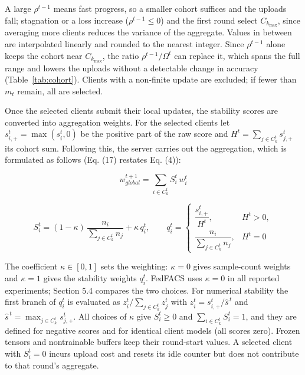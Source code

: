 \documentclass[pdflatex,sn-mathphys-num,oneside]{sn-jnl}%
\theoremstyle{thmstyleone}%
\theoremstyle{thmstyletwo}%
\theoremstyle{thmstylethree}%
\begin{document}
A large $\rho^{t-1}$ means fast progress, so a smaller cohort suffices and the uploads fall; stagnation or a loss increase ($\rho^{t-1}\le 0$) and the first round select $C_{k_{\max}}$, since averaging more clients reduces the variance of the aggregate. Values in between are interpolated linearly and rounded to the nearest integer. Since $\rho^{t-1}$ alone keeps the cohort near $C_{k_{\max}}$, the ratio $\rho^{t-1}/\Omega^{t}$ can replace it, which spans the full range and lowers the uploads without a detectable change in accuracy (Table~\ref{tab:cohort}). Clients with a non-finite update are excluded; if fewer than $m_t$ remain, all are selected.

Once the selected clients submit their local updates, the stability scores are converted into aggregation weights. For the selected clients let $s_{i,+}^t=\max(s_i^t,0)$ be the positive part of the raw score and $H^t=\sum_{j\in C_k^t}s_{j,+}^t$ its cohort sum. Following this, the server carries out the aggregation, which is formulated as follows (Eq. (17) restates Eq. (4)):

\begin{equation}
w_{{global}}^{t+1} = \sum_{i \in C_k^t} S_i^t \, w_i^t
\label{eq:stability_weighted_update}
\end{equation}

\begin{equation}
S_i^t = (1-\kappa)\,\dfrac{n_i}{\sum_{j\in C_k^t} n_j} + \kappa\,q_i^t,\qquad q_i^t=\begin{cases}
\dfrac{s_{i,+}^t}{H^t}, & H^t>0,\\[1.5ex]
\dfrac{n_i}{\sum_{j\in C_k^t} n_j}, & H^t=0
\end{cases}
\label{eq:stability_norm}
\end{equation}

The coefficient $\kappa\in[0,1]$ sets the weighting: $\kappa=0$ gives sample-count weights and $\kappa=1$ gives the stability weights $q_i^t$. FedFACS uses $\kappa=0$ in all reported experiments; Section 5.4 compares the two choices. For numerical stability the first branch of $q_i^t$ is evaluated as $z_i^t/\sum_{j\in C_k^t}z_j^t$ with $z_i^t=s_{i,+}^t/\hat{s}^{\,t}$ and $\hat{s}^{\,t}=\max_{j\in C_k^t}s_{j,+}^t$. All choices of $\kappa$ give $S_i^t\ge 0$ and $\sum_{i\in C_k^t}S_i^t=1$, and they are defined for negative scores and for identical client models (all scores zero). Frozen tensors and nontrainable buffers keep their round-start values. A selected client with $S_i^t=0$ incurs upload cost and resets its idle counter but does not contribute to that round's aggregate.
\end{document}
